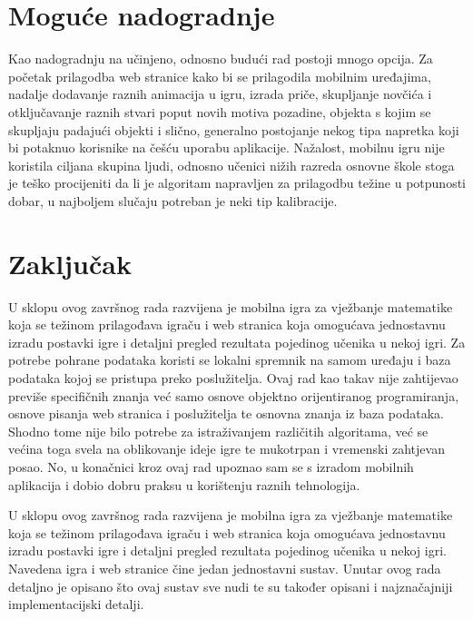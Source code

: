\documentclass[times, utf8, zavrsni, numeric]{fer}
\begin{document}
\chapter{Moguće nadogradnje}
Kao nadogradnju na učinjeno, odnosno budući rad postoji mnogo opcija. Za početak prilagodba web stranice kako bi se prilagodila mobilnim uređajima, nadalje dodavanje raznih animacija u igru, izrada priče, skupljanje novčića
i otključavanje raznih stvari poput novih motiva pozadine, objekta s kojim se skupljaju padajući objekti i slično, generalno postojanje nekog tipa napretka koji bi potaknuo korisnike na češću uporabu aplikacije.
Nažalost, mobilnu igru nije koristila ciljana skupina ljudi, odnosno učenici nižih razreda osnovne škole stoga je teško procijeniti da li je algoritam napravljen za prilagodbu težine u potpunosti dobar, u najboljem slučaju potreban
je neki tip kalibracije. 

\chapter{Zaključak}
U sklopu ovog završnog rada razvijena je mobilna igra za vježbanje matematike koja se težinom prilagođava igraču  i web stranica koja omogućava jednostavnu izradu
postavki igre i detaljni pregled rezultata pojedinog učenika u nekoj igri. Za potrebe pohrane podataka koristi se lokalni spremnik na samom uređaju i baza podataka kojoj se pristupa preko poslužitelja.
Ovaj rad kao takav nije zahtijevao previše specifičnih znanja već samo osnove objektno orijentiranog programiranja, osnove pisanja web stranica i poslužitelja te osnovna znanja iz baza podataka. Shodno tome nije bilo 
potrebe za istraživanjem različitih algoritama, već se većina toga svela na oblikovanje ideje igre te mukotrpan i vremenski zahtjevan posao. No, u konačnici kroz ovaj rad upoznao sam se s izradom mobilnih aplikacija 
i dobio dobru praksu u korištenju raznih tehnologija.





\begin{sazetak}
U sklopu ovog završnog rada razvijena je mobilna igra za vježbanje matematike koja se težinom prilagođava igraču  i web stranica koja omogućava jednostavnu izradu
postavki igre i detaljni pregled rezultata pojedinog učenika u nekoj igri. Navedena igra i web stranice čine jedan jednostavni sustav. Unutar ovog rada detaljno je opisano što ovaj sustav sve nudi te su također opisani
i najznačajniji implementacijski detalji.

\end{sazetak}
\end{document}
